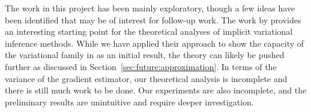 \documentclass[10pt]{article}
\begin{document}
The work in this project has been mainly exploratory, though a few ideas have been identified that may be of interest for follow-up work. The work by \citet{Plummer:2021} provides an interesting starting point for the theoretical analyses of implicit variational inference methods. While we have applied their approach to show the capacity of the variational family in \uivi as an initial result, the theory can likely be pushed further as discussed in Section~\ref{sec:future:approximation}. In terms of the variance of the \elbo gradient estimator, our theoretical analysis is incomplete and there is still much work to be done. Our experiments are also incomplete, and the preliminary results are unintuitive and require deeper investigation.


\newpage




\end{document}
